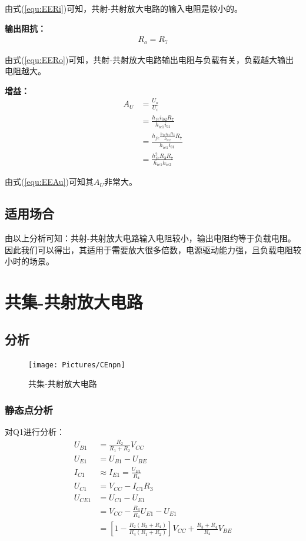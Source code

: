 \documentclass[11pt,a4paper,UTF8]{ctexart}
\begin{document}
			由式(\ref{equ:EERi})可知，共射-共射放大电路的输入电阻是较小的。
			
			\textbf{输出阻抗：}
			\begin{align}
				R_o = R_7 \label{equ:EERo}
			\end{align}
			
			由式(\ref{equ:EERo})可知，共射-共射放大电路输出电阻与负载有关，负载越大输出电阻越大。
			
			\textbf{增益：}
			\begin{align}
				A_U &= \frac{U_o}{U_i} \nonumber\\
				&= \frac{h_{fe}i_{ib2}R_7}{h_{ie1}i_{b1}} \nonumber\\
				&= \frac{h_{fe}\frac{h_{fe}i_{b1}R_3}{h_{ie2}}R_7}{h_{ie1}i_{b1}} \nonumber \\
				&= \frac{h^2_{fe}R_3R_7}{h_{ie1}h_{ie2}} \label{equ:EEAu}
			\end{align}
			
			由式(\ref{equ:EEAu})可知其$A_U$非常大。
			
			\subsection{适用场合}
				由以上分析可知：共射-共射放大电路输入电阻较小，输出电阻约等于负载电阻。因此我们可以得出，其适用于需要放大很多倍数，电源驱动能力强，且负载电阻较小时的场景。
			
	\section{共集-共射放大电路}
		\subsection{分析}
			\begin{figure}[H]
				\centering
				\texttt{[image: Pictures/CEnpn]}
				\caption{共集-共射放大电路}
				\label{fig:cenpn}
			\end{figure}

			\subsubsection{静态点分析}
				对Q1进行分析：
				\begin{align}
					U_{B1} &= \frac{R_2}{R_1+R_2}V_{CC} \\
					U_{E1} &= U_{B1} - U_{BE} \\
					I_{C1} &\approx I_{E1} = \frac{U_{E1}}{R_4} \\
					U_{C1} &= V_{CC} - I_{C1}R_3 \\
					U_{CE1} &= U_{C1} - U_{E1} \nonumber\\
					&= V_{CC} - \frac{R_3}{R_4}U_{E1} - U_{E1} \nonumber\\
					&= [1-\frac{R_2(R_3+R_4)}{R_4(R_1+R_2)}]V_{CC} + \frac{R_3+R_4}{R_4}V_{BE}
				\end{align}
				
\end{document}
